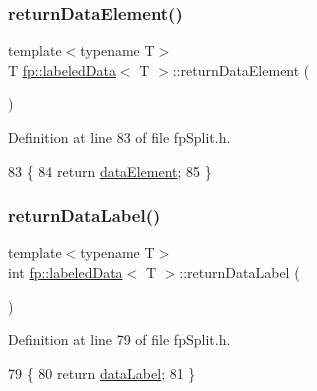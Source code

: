 \subsubsection{\texorpdfstring{return\+Data\+Element()}{returnDataElement()}}
{\footnotesize\ttfamily template$<$typename T$>$ \\
T \hyperlink{classfp_1_1labeledData}{fp\+::labeled\+Data}$<$ T $>$\+::return\+Data\+Element (\begin{DoxyParamCaption}{ }\end{DoxyParamCaption})\hspace{0.3cm}{\ttfamily [inline]}}



Definition at line 83 of file fp\+Split.\+h.


\begin{DoxyCode}
83                                             \{
84                     \textcolor{keywordflow}{return} \hyperlink{classfp_1_1labeledData_a02564fc812e8a1f4d4ca6edab114d246}{dataElement};
85                 \}
\end{DoxyCode}
\mbox{\label{classfp_1_1labeledData_a8e58e52ea65c0406455e62a67c7bbd0e}} 
\subsubsection{\texorpdfstring{return\+Data\+Label()}{returnDataLabel()}}
{\footnotesize\ttfamily template$<$typename T$>$ \\
int \hyperlink{classfp_1_1labeledData}{fp\+::labeled\+Data}$<$ T $>$\+::return\+Data\+Label (\begin{DoxyParamCaption}{ }\end{DoxyParamCaption})\hspace{0.3cm}{\ttfamily [inline]}}



Definition at line 79 of file fp\+Split.\+h.


\begin{DoxyCode}
79                                             \{
80                     \textcolor{keywordflow}{return} \hyperlink{classfp_1_1labeledData_a833f4ca245e8c17b8d28c50dc3922eef}{dataLabel};
81                 \}
\end{DoxyCode}
\mbox{\label{classfp_1_1labeledData_aea8710b6f8eb99fe23d8ac05eab51980}} 
